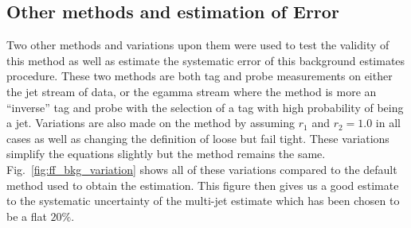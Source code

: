 \subsection{Other methods and estimation of Error}
   \label{sec:MJerror}


Two other methods and variations upon them were used to test the validity of this method as well as estimate the systematic error of this background estimates procedure. These two methods are both tag and probe measurements on either the jet stream of data, or the egamma stream where the method is more an ``inverse'' tag and probe with the selection of a tag with high probability of being a jet. Variations are also made on the method by assuming $r_{1}$ and $r_{2} = 1.0$ in all cases as well as changing the definition of loose but fail tight. These variations simplify the equations slightly but the method remains the same. Fig.~\ref{fig:ff_bkg_variation} shows all of these variations compared to the default method used to obtain the estimation. This figure then gives us a good estimate to the systematic uncertainty of the multi-jet estimate which has been chosen to be a flat $20\%$.

